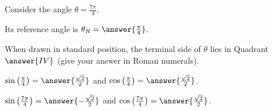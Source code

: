 \documentclass{ximera}
\author{Kenneth Berglund}
\begin{document}
\begin{exercise}
Consider the angle $\theta = \frac{7\pi}{4}$. 

Its reference angle is $\theta_R = \answer{\frac{\pi}{4}}$.

When drawn in standard position, the terminal side of $\theta$ lies in Quadrant $\answer{IV}$ (give your answer in Roman numerals). 

\begin{exercise}
$\sin\left(\frac{\pi}{4}\right) = \answer{\frac{\sqrt{2}}{2}}$ and $\cos\left(\frac{\pi}{4}\right) = \answer{\frac{\sqrt{2}}{2}}$.

\begin{exercise}
$\sin\left(\frac{7\pi}{4}\right) = \answer{-\frac{\sqrt{2}}{2}}$ and $\cos\left(\frac{7\pi}{4}\right) = \answer{\frac{\sqrt{2}}{2}}$.
\end{exercise}
\end{exercise}

\end{exercise}
\end{document}
